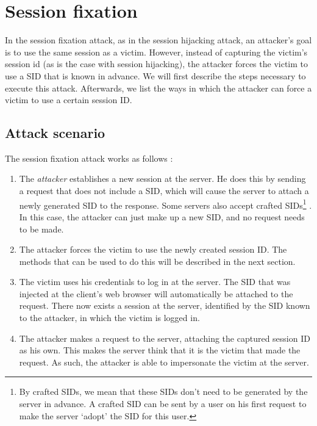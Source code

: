 \section{Session fixation}\label{fixation}

In the session fixation attack, as in the \gls{session hijacking} attack, an attacker's goal is to use the same session as a victim. However, instead of capturing the victim's \gls{session id} (as is the case with session hijacking), the attacker forces the victim to use a SID that is known in advance. We will first describe the steps necessary to execute this attack. Afterwards, we list the ways in which the attacker can force a victim to use a certain session ID.

\subsection{Attack scenario}\label{fixation-scenario}

The session fixation attack works as follows \cite{Kolsek2002}:

\begin{enumerate}
	\item The \emph{attacker} establishes a new session at the server. He does this by sending a request that does not include a SID, which will cause the server to attach a newly generated
SID to the response. Some servers also accept crafted SIDs\footnote{By crafted SIDs, we mean that these SIDs don't need to be generated by the server in advance. A crafted SID can be sent by a user on his first request to make the server `adopt' the SID for this user.} \cite{Shiflett2004}. In this case, the attacker can just make up a new SID, and no request needs to be made.
	\item The attacker forces the victim to use the newly created session ID. The methods that can be used to do this will be described in the next section.
	\item The victim uses his credentials to log in at the server. The SID that was injected at the client's web browser will automatically be attached to the request. There now exists a session at the server, identified by the SID known to the attacker, in which the victim is logged in.
	\item The attacker makes a request to the server, attaching the captured session ID as his own. This makes the server think that it is the victim that made the request. As such, the attacker is able to impersonate the victim at the server.
\end{enumerate}

